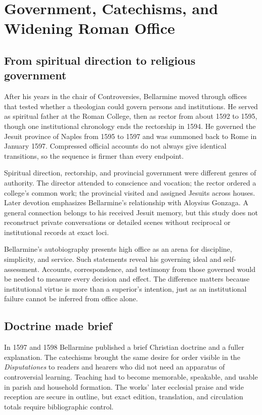 \section{Government, Catechisms, and Widening Roman Office}

\subsection{From spiritual direction to religious government}

After his years in the chair of Controversies, Bellarmine moved through offices
that tested whether a theologian could govern persons and institutions.  He
served as spiritual father at the Roman College, then as rector from about
1592 to 1595, though one institutional chronology ends the rectorship in 1594.
He governed the Jesuit province of Naples from 1595 to 1597 and was summoned
back to Rome in January 1597.  Compressed official accounts do not always give
identical transitions, so the sequence is firmer than every endpoint.

Spiritual direction, rectorship, and provincial government were different
genres of authority.  The director attended to conscience and vocation; the
rector ordered a college's common work; the provincial visited and assigned
Jesuits across houses.  Later devotion emphasizes Bellarmine's relationship
with Aloysius Gonzaga.  A general connection belongs to his received Jesuit
memory, but this study does not reconstruct private conversations or detailed
scenes without reciprocal or institutional records at exact loci.

Bellarmine's autobiography presents high office as an arena for discipline,
simplicity, and service.  Such statements reveal his governing ideal and
self-assessment.  Accounts, correspondence, and testimony from those governed
would be needed to measure every decision and effect.  The difference matters
because institutional virtue is more than a superior's intention, just as an
institutional failure cannot be inferred from office alone.

\subsection{Doctrine made brief}

In 1597 and 1598 Bellarmine published a brief Christian doctrine and a fuller
explanation.  The catechisms brought the same desire for order visible in the
\emph{Disputationes} to readers and hearers who did not need an apparatus of
controversial learning.  Teaching had to become memorable, speakable, and
usable in parish and household formation.  The works' later ecclesial praise
and wide reception are secure in outline, but exact edition, translation, and
circulation totals require bibliographic control.

